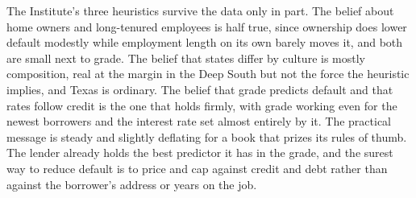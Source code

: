 \documentclass[11pt,preprint]{elsarticle}
\numberwithin{equation}{section}
\numberwithin{figure}{section}
\numberwithin{table}{section}
\begin{document}
The Institute's three heuristics survive the data only in part. The
belief about home owners and long-tenured employees is half true, since
ownership does lower default modestly while employment length on its own
barely moves it, and both are small next to grade. The belief that
states differ by culture is mostly composition, real at the margin in
the Deep South but not the force the heuristic implies, and Texas is
ordinary. The belief that grade predicts default and that rates follow
credit is the one that holds firmly, with grade working even for the
newest borrowers and the interest rate set almost entirely by it. The
practical message is steady and slightly deflating for a book that
prizes its rules of thumb. The lender already holds the best predictor
it has in the grade, and the surest way to reduce default is to price
and cap against credit and debt rather than against the borrower's
address or years on the job.


\end{document}
